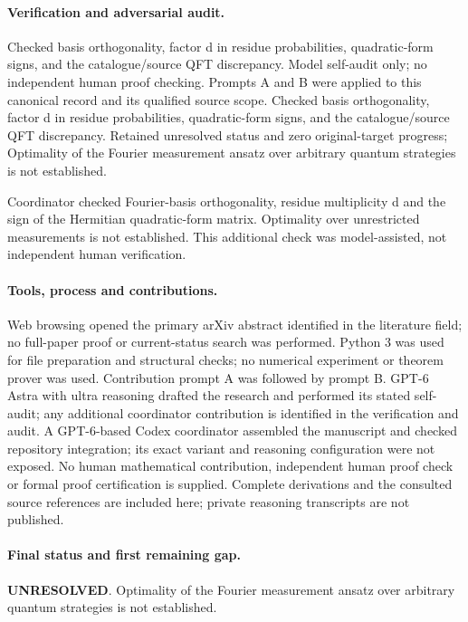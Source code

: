 \documentclass[11pt]{article}
\begin{document}
\paragraph{Verification and adversarial audit.}
Checked basis orthogonality, factor d in residue probabilities, quadratic-form signs, and the catalogue/source QFT discrepancy. Model self-audit only; no independent human proof checking. Prompts A and B were applied to this canonical record and its qualified source scope. Checked basis orthogonality, factor d in residue probabilities, quadratic-form signs, and the catalogue/source QFT discrepancy. Retained unresolved status and zero original-target progress; Optimality of the Fourier measurement ansatz over arbitrary quantum strategies is not established.

Coordinator checked Fourier-basis orthogonality, residue multiplicity d and the sign of the Hermitian quadratic-form matrix. Optimality over unrestricted measurements is not established. This additional check was model-assisted, not independent human verification.

\paragraph{Tools, process and contributions.}
Web browsing opened the primary arXiv abstract identified in the literature field; no full-paper proof or current-status search was performed. Python 3 was used for file preparation and structural checks; no numerical experiment or theorem prover was used. Contribution prompt A was followed by prompt B. GPT-6 Astra with ultra reasoning drafted the research and performed its stated self-audit; any additional coordinator contribution is identified in the verification and audit. A GPT-6-based Codex coordinator assembled the manuscript and checked repository integration; its exact variant and reasoning configuration were not exposed. No human mathematical contribution, independent human proof check or formal proof certification is supplied. Complete derivations and the consulted source references are included here; private reasoning transcripts are not published.

\paragraph{Final status and first remaining gap.}
\textbf{UNRESOLVED}. Optimality of the Fourier measurement ansatz over arbitrary quantum strategies is not established.
\end{document}
